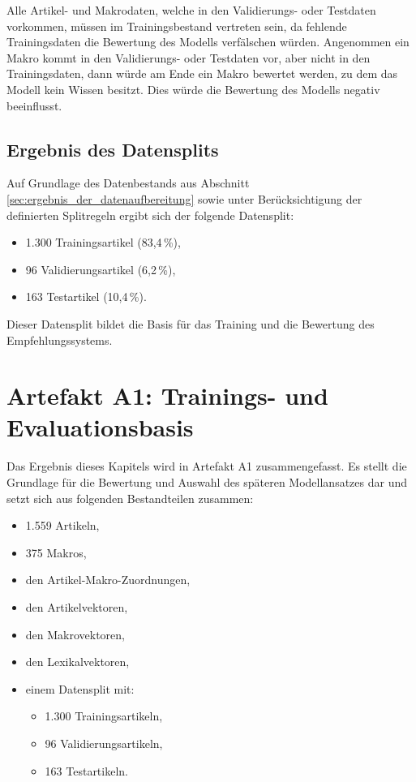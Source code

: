 Alle Artikel- und Makrodaten, welche in den Validierungs- oder Testdaten vorkommen, müssen im Trainingsbestand vertreten sein, da fehlende Trainingsdaten die Bewertung des Modells verfälschen würden. 
Angenommen ein Makro kommt in den Validierungs- oder Testdaten vor, aber nicht in den Trainingsdaten, dann würde am Ende ein Makro bewertet werden, zu dem das Modell kein Wissen besitzt. Dies würde die Bewertung des Modells negativ beeinflusst.


\subsection{Ergebnis des Datensplits}

Auf Grundlage des Datenbestands aus Abschnitt \ref{sec:ergebnis_der_datenaufbereitung} sowie unter Berücksichtigung der definierten Splitregeln ergibt sich der folgende Datensplit: 

\begin{itemize} 
\item 1.300 Trainingsartikel (83,4\,\%), 
\item 96 Validierungsartikel (6,2\,\%), 
\item 163 Testartikel (10,4\,\%). 
\end{itemize}

Dieser Datensplit bildet die Basis für das Training und die Bewertung des Empfehlungssystems.

\newpage

\section{Artefakt A1: Trainings- und Evaluationsbasis} 

Das Ergebnis dieses Kapitels wird in Artefakt A1 zusammengefasst.
Es stellt die Grundlage für die Bewertung und Auswahl des späteren Modellansatzes dar und setzt sich aus folgenden Bestandteilen zusammen:

\begin{itemize} 
    \item 1.559 Artikeln, 
    \item 375 Makros, 
    \item den Artikel-Makro-Zuordnungen, 
    \item den Artikelvektoren, 
    \item den Makrovektoren, 
    \item den Lexikalvektoren, 
    \item einem Datensplit mit:
    \begin{itemize} 
        \item 1.300 Trainingsartikeln, 
        \item 96 Validierungsartikeln, 
        \item 163 Testartikeln. 
    \end{itemize} 
\end{itemize} 



